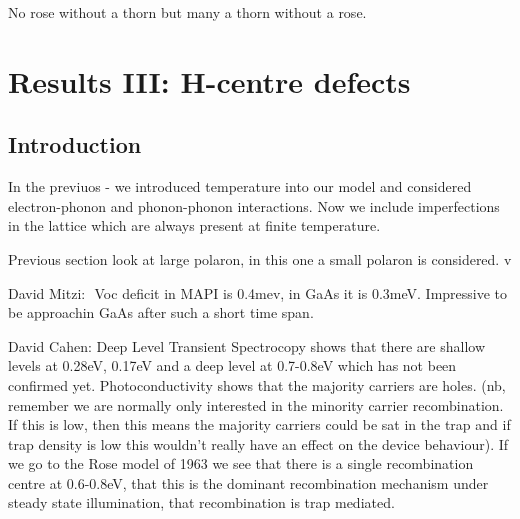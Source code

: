 \begin{savequote}[8cm]
No rose without a thorn but many a thorn without a rose.
\end{savequote}

\chapter{\label{ch:6-defects}Results III: H-centre defects}

\section{Introduction}
In the previuos - we introduced temperature into our model and considered electron-phonon and phonon-phonon interactions. Now we include imperfections in the lattice which are always present at finite temperature.

Previous section look at large polaron, in this one a small polaron is considered.
 v

David Mitzi: 
Voc deficit in MAPI is 0.4mev, in GaAs it is 0.3meV. Impressive to be approachin GaAs after such a short time span.


David Cahen: Deep Level Transient Spectrocopy shows that there are shallow levels at 0.28eV, 0.17eV and a deep level at 0.7-0.8eV which has not been confirmed yet.
Photoconductivity shows that the majority carriers are holes. (nb, remember we are normally only interested in the minority carrier recombination. If this is low, then this means the majority carriers could be sat in the trap and if trap density is low this wouldn’t really have an effect on the device behaviour).
If we go to the Rose model of 1963 we see that there is a single recombination centre at 0.6-0.8eV, that this is the dominant recombination mechanism under steady state illumination, that recombination is trap mediated. 

